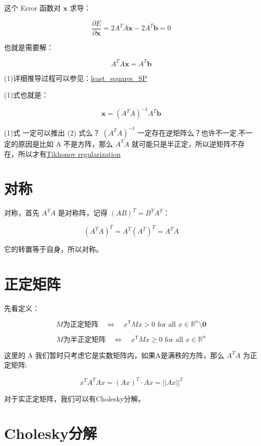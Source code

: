 \documentclass[
]{book}
\begin{document}
这个 Error 函数对 \(\mathbf{x}\) 求导：

\[
\frac{\partial E}{\partial \mathbf{x}} =  2A^TA\mathbf{x} - 2 A^T \mathbf{b}= 0
\]

也就是需要解：

\[
A^TA\mathbf{x} = A^T \mathbf{b} \tag{1}
\]

(1)详细推导过程可以参见：\href{http://eeweb.poly.edu/iselesni/lecture_notes/least_squares/least_squares_SP.pdf}{least\_squares\_SP}

(1)式也就是：

\[
\mathbf{x} = (A^TA)^{-1} A^T \mathbf{b}  \tag{2}
\]

(1)式 一定可以推出 (2) 式么？ \((A^TA)^{-1}\) 一定存在逆矩阵么？也许不一定,不一定的原因是比如 A 不是方阵，那么 \(A^TA\) 就可能只是半正定，所以逆矩阵不存在，所以才有\href{https://en.wikipedia.org/wiki/Tikhonov_regularization}{Tikhonov regularization}

\hypertarget{ux5bf9ux79f0}{%
\section{对称}\label{ux5bf9ux79f0}}

对称，首先 \(A^TA\) 是对称阵，记得 \((AB)^T = B^TA^T\)：

\[(A^TA)^T  = A^T (A^T)^T = A^TA\]

它的转置等于自身，所以对称。

\hypertarget{ux6b63ux5b9aux77e9ux9635}{%
\section{正定矩阵}\label{ux6b63ux5b9aux77e9ux9635}}

先看定义：

\[
{\displaystyle M{\text{为正定矩阵}}\quad \iff \quad x^{\textsf {T}}Mx>0{\text{ for all }}x\in \mathbb {R} ^{n}\setminus \mathbf {0} }
\]

\[
{\displaystyle M{\text{为半正定矩阵}}\quad \iff \quad x^{\textsf {T}}Mx \ge 0{\text{ for all }}x\in \mathbb {R} ^{n}}
\]

这里的 A 我们暂时只考虑它是实数矩阵内，如果A是满秩的方阵，那么 \(A^TA\) 为正定矩阵:

\[x^TA^TAx = (Ax)^T \cdot Ax = ||Ax||^2\]

对于实正定矩阵，我们可以有Cholesky分解。

\hypertarget{choleskyux5206ux89e3}{%
\section{Cholesky分解}\label{choleskyux5206ux89e3}}
\end{document}
